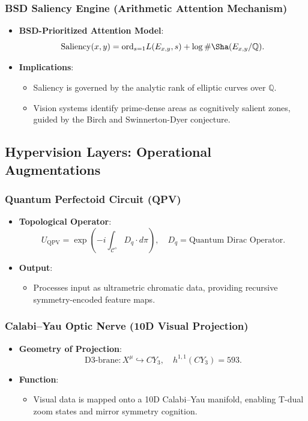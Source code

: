 \documentclass[12pt]{article}
\begin{document}
\subsubsection{BSD Saliency Engine (Arithmetic Attention Mechanism)}
\begin{itemize}
    \item \textbf{BSD-Prioritized Attention Model}:
    \[
    \mathrm{Saliency}(x, y) = \mathrm{ord}_{s=1} L(E_{x,y}, s) + \log \#\Sha(E_{x,y}/\mathbb{Q}).
    \]
    \item \textbf{Implications}:
    \begin{itemize}
        \item Saliency is governed by the analytic rank of elliptic curves over \( \mathbb{Q} \).
        \item Vision systems identify prime-dense areas as cognitively salient zones, guided by the Birch and Swinnerton-Dyer conjecture.
    \end{itemize}
\end{itemize}

\subsection{Hypervision Layers: Operational Augmentations}

\subsubsection{Quantum Perfectoid Circuit (QPV)}
\begin{itemize}
    \item \textbf{Topological Operator}:
    \[
    U_{\mathrm{QPV}} = \exp\left(-i \int_{\mathcal{C}^\diamond} D_q \cdot d\pi\right), \quad D_q = \text{Quantum Dirac Operator}.
    \]
    \item \textbf{Output}:
    \begin{itemize}
        \item Processes input as ultrametric chromatic data, providing recursive symmetry-encoded feature maps.
    \end{itemize}
\end{itemize}

\subsubsection{Calabi–Yau Optic Nerve (10D Visual Projection)}
\begin{itemize}
    \item \textbf{Geometry of Projection}:
    \[
    \mathrm{D3}\text{-brane}: X^\mu \hookrightarrow CY_3, \quad h^{1,1}(CY_3) = 593.
    \]
    \item \textbf{Function}:
    \begin{itemize}
        \item Visual data is mapped onto a 10D Calabi–Yau manifold, enabling T-dual zoom states and mirror symmetry cognition.
    \end{itemize}
\end{itemize}
\end{document}

